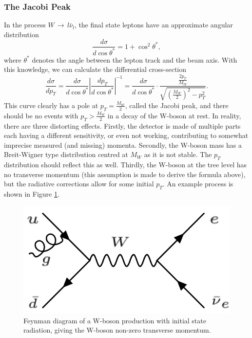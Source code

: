 \documentclass[twocolumn]{article}
\begin{document}
\subsubsection{The Jacobi Peak} \label{sec:yo}
In the process $W \, \rightarrow \, l \bar{\nu}_l$, the final state leptons have an approximate angular distribution~\cite{manual}
\begin{equation}
\frac{d\sigma}{d\cos \theta^*} = 1 + \cos^2 \theta^*, \nonumber
\end{equation}
where $\theta^*$ denotes the angle between the lepton track and the beam axis.
With this knowledge, we can calculate the differential cross-section
\begin{equation}
\frac{d \sigma}{d p_T} = \frac{d \sigma}{d \cos \theta^*} \left\vert \frac{d p_T}{d \cos \theta^*} \right\vert^{-1} = \frac{d \sigma}{d \cos \theta^*} \cdot  \frac{\frac{2p_T}{M_W}}{\sqrt{\left( \frac{M_W}{2}\right)^2 - p_T^2}}. \nonumber
\end{equation}
This curve clearly has a pole at $p_T = \frac{M_W}{2}$, called the Jacobi peak, and there should be no events with $p_T > \frac{M_W}{2}$ in a decay of the W-boson at rest. In reality, there are three distorting effects. Firstly, the detector is made of multiple parts each having a different sensitivity, or even not working, contributing to somewhat imprecise measured (and missing) momenta. Secondly, the W-boson mass has a Breit-Wigner type distribution centred at $M_W$ as it is not stable. The $p_T$ distribution should reflect this as well. Thirdly, the W-boson at the tree level has no transverse momentum (this assumption is made to derive the formula above), but the radiative corrections allow for some initial $p_T$. An example process is shown in Figure \ref{fig:WRadiation}. 
\begin{figure} [!h]
\centering
\includegraphics[scale=0.25]{Images/WRadiation.png}
\caption{Feynman diagram of a W-boson production with initial state radiation, giving the W-boson non-zero transverse momentum.}
\label{fig:WRadiation}
\end{figure}
\end{document}
